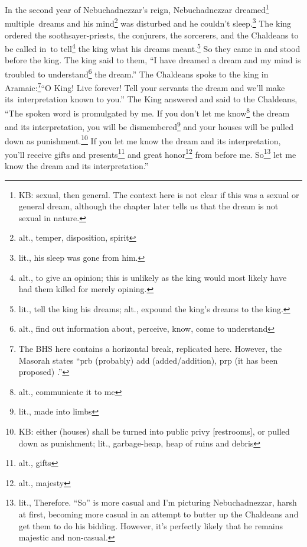 
\begin{inparaenum}
     In the second year of Nebuchadnezzar's reign, Nebuchadnezzar dreamed\footnote{KB: sexual, then general. The context here is not clear if this was a sexual or general dream, although the chapter later tells us that the dream is not sexual in nature.} multiple\understood\ dreams and his mind\footnote{alt., temper, disposition, spirit} was disturbed and he couldn't sleep.\footnote{lit., his sleep was gone from him.}%
     The king ordered the soothsayer-priests, the conjurers, the sorcerers, and the Chaldeans to be called in\understood\ to tell\footnote{alt., to give an opinion; this is unlikely as the king would most likely have had them killed for merely opining.} the king what his dreams meant.\footnote{lit., tell the king his dreams; alt., expound the king's dreams to the king.} So they came in and stood before the king.%
     The king said to them, ``I have dreamed a dream and my mind is troubled to understand\footnote{alt., find out information about, perceive, know, come to understand} the dream.''%
     The Chaldeans spoke to the king in Aramaic:\footnote{The BHS here contains a horizontal break, replicated here. However, the Masorah states ``prb (probably) add (added/addition), prp (it has been proposed) .''}\hspace*{4em}``O King! Live forever! Tell your servants the dream and we'll make its\understood\ interpretation known to you.''%
     The King answered and said to the Chaldeans, ``The spoken word is promulgated by me. If you don't let me know\footnote{alt., communicate it to me} the dream and its interpretation, you will be dismembered\footnote{lit., made into limbs} and your houses will be pulled down as punishment.\footnote{KB: either (houses) shall be turned into public privy [restrooms], or pulled down as punishment; lit., garbage-heap, heap of ruins and debris}%
     If you let me know the dream and its interpretation, you'll receive gifts and presents\footnote{alt., gifts} and great honor\footnote{alt., majesty} from before me. So\footnote{lit., Therefore. ``So'' is more casual and I'm picturing Nebuchadnezzar, harsh at first, becoming more casual in an attempt to butter up the Chaldeans and get them to do his bidding. However, it's perfectly likely that he remains majestic and non-casual.} let me know the dream and its interpretation.''%

\end{inparaenum}
